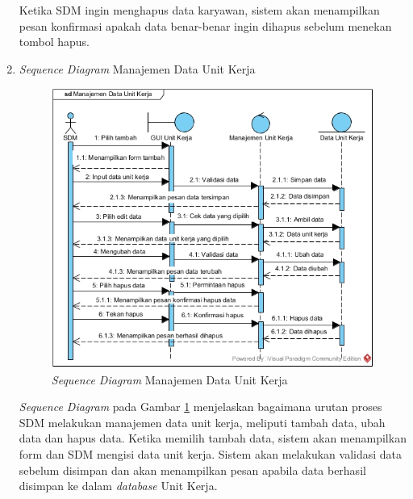 \begin{enumerate}
            		Ketika SDM ingin menghapus data karyawan, sistem akan menampilkan pesan konfirmasi apakah data benar-benar ingin dihapus sebelum menekan tombol hapus.
            	\item \emph{Sequence Diagram} Manajemen Data Unit Kerja
			        \begin{figure}[H]
            		    \centering
            		    \includegraphics[width=13cm]{gambar/sequence/manajemen-unit-kerja}
            		    \caption{\emph{Sequence Diagram} Manajemen Data Unit Kerja}
            		    \label{sequence_manajemen_unitkerja}
            		\end{figure}
            		\emph{Sequence Diagram} pada Gambar \ref{sequence_manajemen_unitkerja} menjelaskan bagaimana urutan proses SDM melakukan manajemen data unit kerja, meliputi tambah data, ubah data dan hapus data. Ketika memilih tambah data, sistem akan menampilkan form dan SDM mengisi data unit kerja. Sistem akan melakukan validasi data sebelum disimpan dan akan menampilkan pesan apabila data berhasil disimpan ke dalam \emph{database} Unit Kerja.
            		

\end{enumerate}

